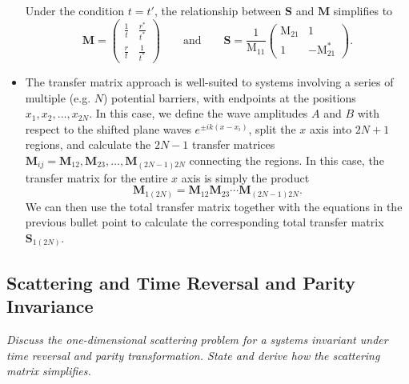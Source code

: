 \documentclass[11pt, a4paper]{article}
\newcommand{\mat}[1]{\mathbf{#1}}  %
\renewcommand{\SS}{\mat{S}}  %
\newcommand{\M}{\mat{M}}  %
\newcommand{\MM}{\mathrm{M}}  %
\begin{document}
\begin{itemize}
    Under the condition $ t = t' $, the relationship between $ \SS $ and $ \M $ simplifies to
    \begin{equation*}
        \M = 
        \begin{pmatrix}
            \frac{1}{t} & \frac{r^{*}}{t^{*}}\\[0.5mm]
            \frac{r}{t} & \frac{1}{t^{*}}
        \end{pmatrix}
        \qquad \text{and} \qquad \SS = \frac{1}{\MM_{11}}
        \begin{pmatrix}
            \MM_{21} & 1\\
            1 & - \MM_{21}^{*}
        \end{pmatrix}.
    \end{equation*}
    
    \item The transfer matrix approach is well-suited to systems involving a series of  multiple (e.g. $ N $) potential barriers, with endpoints at the positions $ x_{1}, x_{2}, \ldots, x_{2N}$. In this case, we define the wave amplitudes $ A $ and $ B $ with respect to the shifted plane waves $ e^{\pm i k(x - x_{i})} $, split the $ x $ axis into $ 2N + 1 $ regions, and calculate the $ 2N - 1 $ transfer matrices $ \M_{ij} = \M_{12}, \M_{23}, \ldots, \M_{(2N-1) 2N} $ connecting the regions. In this case, the transfer matrix for the entire $ x $ axis is simply the product
    \begin{equation*}
        \M_{1(2N)} = \M_{12}\M_{23} \cdots \M_{(2N-1)2N}.
    \end{equation*}
    We can then use the total transfer matrix together with the equations in the previous bullet point to calculate the corresponding total transfer matrix $ \SS_{1(2N)} $.

\end{itemize}
\subsection{Scattering and Time Reversal and Parity Invariance}
\textit{Discuss the one-dimensional scattering problem for a systems invariant under time reversal and parity transformation. State and derive how the scattering matrix simplifies.}
\end{document}
